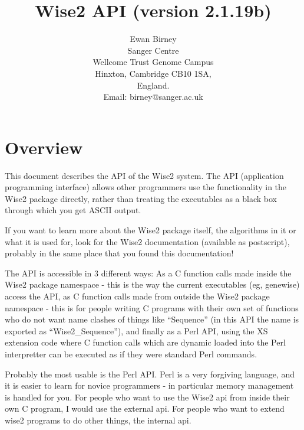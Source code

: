 

\newcommand{\programtext}[1]{{\tt #1}}

\title{Wise2 API (version 2.1.19b)}
\author{Ewan Birney\\
Sanger Centre\\
Wellcome Trust Genome Campus\\
Hinxton, Cambridge CB10 1SA,\\
England.\\
Email: birney@sanger.ac.uk}

\maketitle
 
\newpage
\tableofcontents
\newpage

\section{Overview}

This document describes the API of the Wise2 system. The API
(application programming interface) allows other programmers
use the functionality in the Wise2 package directly, rather
than treating the executables as a black box through which
you get ASCII output.

If you want to learn more about the Wise2 package itself, the
algorithms in it or what it is used for, look for the Wise2 
documentation (available as postscript), probably in the same
place that you found this documentation!

The API is accessible in 3 different ways: As a C function calls
made inside the Wise2 package namespace - this is the way 
the current executables (eg, genewise) access the API, as C
function calls made from outside the Wise2 package namespace - this
is for people writing C programs with their own set of functions who
do not want name clashes of things like ``Sequence'' (in this API
the name is exported as ``Wise2\_Sequence''), and finally as a Perl
API, using the XS extension code where C function calls which are
dynamic loaded into the Perl interpretter can be executed as if
they were standard Perl commands.

Probably the most usable is the Perl API. Perl is a very forgiving
language, and it is easier to learn for novice programmers - in
particular memory management is handled for you. For people who want
to use the Wise2 api from inside their own C program, I would use the
external api. For people who want to extend wise2 programs to do other
things, the internal api.

